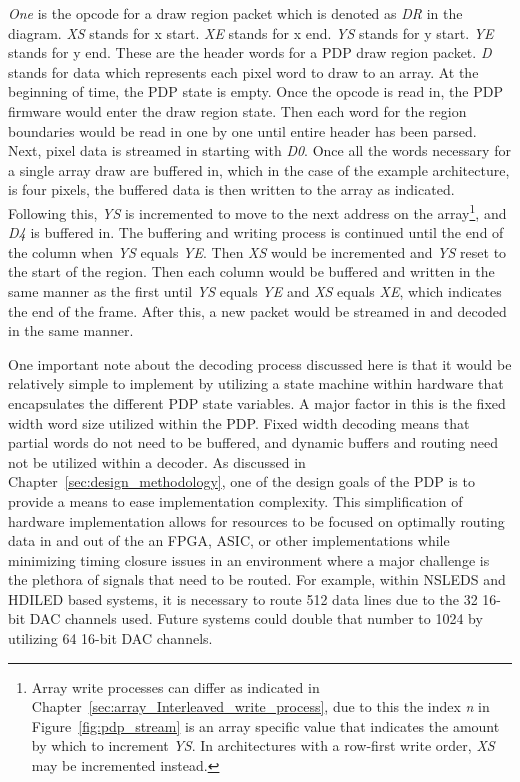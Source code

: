    {\it One} is the opcode for a draw region packet which is denoted as {\it DR} in the diagram. {\it XS} stands for x start. {\it XE} stands for x end. {\it YS} stands for y start. {\it YE} stands for y end. These are the header words for a PDP draw region packet. {\it D} stands for data which represents each pixel word to draw to an array. At the beginning of time, the PDP state is empty. Once the opcode is read in, the PDP firmware would enter the draw region state. Then each word for the region boundaries would be read in one by one until entire header has been parsed. Next, pixel data is streamed in starting with {\it D0}. Once all the words necessary for a single array draw are buffered in, which in the case of the example architecture, is four pixels, the buffered data is then written to the array as indicated. Following this, {\it YS} is incremented to move to the next address on the array\footnote{Array write processes can differ as indicated in Chapter~\ref{sec:array_Interleaved_write_process}, due to this the index {\it n} in Figure~\ref{fig:pdp_stream} is an array specific value that indicates the amount by which to increment {\it YS}. In architectures with a row-first write order, {\it XS} may be incremented instead.}, and {\it D4} is buffered in. The buffering and writing process is continued until the end of the column when {\it YS} equals {\it YE}. Then {\it XS} would be incremented and {\it YS} reset to the start of the region. Then each column would be buffered and written in the same manner as the first until {\it YS} equals {\it YE} and {\it XS} equals {\it XE}, which indicates the end of the frame. After this, a new packet would be streamed in and decoded in the same manner.

    One important note about the decoding process discussed here is that it would be relatively simple to implement by utilizing a state machine within hardware that encapsulates the different PDP state variables. A major factor in this is the fixed width word size utilized within the PDP. Fixed width decoding means that partial words do not need to be buffered, and dynamic buffers and routing need not be utilized within a decoder. As discussed in Chapter~\ref{sec:design_methodology}, one of the design goals of the PDP is to provide a means to ease implementation complexity. This simplification of hardware implementation allows for resources to be focused on optimally routing data in and out of the an FPGA, ASIC, or other implementations while minimizing timing closure issues in an environment where a major challenge is the plethora of signals that need to be routed. For example, within NSLEDS and HDILED based systems, it is necessary to route 512 data lines due to the 32 16-bit DAC channels used. Future systems could double that number to 1024 by utilizing 64 16-bit DAC channels.

